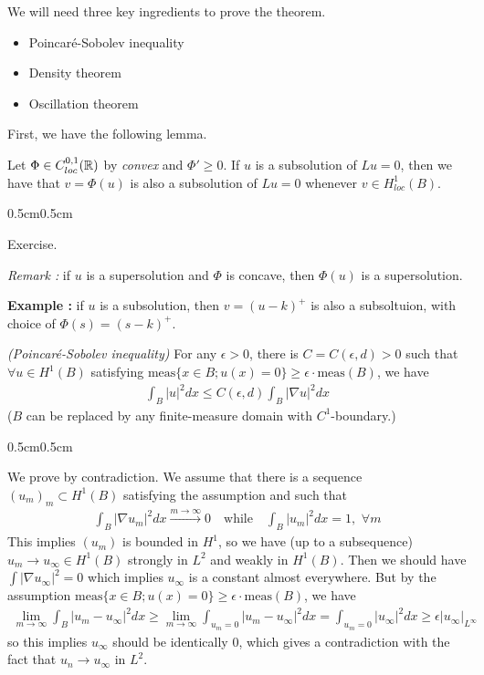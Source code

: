 \documentclass[12pt,a4paper]{article}
\newenvironment{proof}
{\begin{changemargin}{0.5cm}{0.5cm} 
	}%
	{\end{changemargin}
}
\newenvironment{p}
{\begin{proof} 
	}%
	{\end{proof}
}
\begin{document}
We will need three key ingredients to prove the theorem.
\begin{itemize}
\item Poincar\'{e}-Sobolev inequality
\item Density theorem
\item Oscillation theorem
\end{itemize}
\s

First, we have the following lemma.
\s

\lem Let $\Phi \in C^{0,1}_{loc}(\mathbb{R})$ by \emph{convex} and $\Phi' \geq 0$. If $u$ is a subsolution of $Lu =0$, then we have that $v= \Phi(u)$ is also a subsolution of $Lu =0$ whenever $v\in H_{loc}^1(B)$.
\begin{p}
\pf Exercise.
\end{p}
\s

\emph{Remark :} if $u$ is a supersolution and $\Phi$ is concave, then $\Phi(u)$ is a supersolution.
\s

\textbf{Example :} if $u$ is a subsolution, then $v = (u-k)^+$ is also a subsoltuion, with choice of $\Phi(s) = (s-k)^+$.
\s

\prop \emph{(Poincar\'e-Sobolev inequality)} For any $\epsilon >0$, there is $C = C(\epsilon, d)>0$ such that $\forall u\in H^1(B)$ satisfying $\text{meas}\{x\in B ; u(x) =0 \}\geq \epsilon \cdot \text{meas}(B)$, we have
\begin{align*}
\int_B |u|^2 dx \leq C(\epsilon, d) \int_B |\nabla u|^2 dx 
\end{align*}
($B$ can be replaced by any finite-measure domain with $C^{1}$-boundary.)
\begin{p}
\pf We prove by contradiction. We assume that there is a sequence $(u_m)_m \subset H^1(B)$ satisfying the assumption and such that
\begin{align*}
\int_B |\nabla u_m|^2 dx \xrightarrow{m\rightarrow \infty} 0 \quad \text{while} \quad \int_B |u_m|^2 dx = 1, \,\,\forall m
\end{align*} 
This implies $(u_m)$ is bounded in $H^1$, so we have (up to a subsequence) $u_m \rightarrow u_{\infty} \in H^1(B)$ strongly in $L^2$ and weakly in $H^1(B)$. Then we should have $\int |\nabla u_{\infty}|^2 =0$ which implies $u_{\infty}$ is a constant almost everywhere. But by the assumption $\text{meas}\{x\in B ; u(x) =0 \}\geq \epsilon \cdot \text{meas}(B)$, we have
\begin{align*}
\lim_{m\rightarrow \infty} \int_{B} |u_m - u_{\infty}|^2 dx \geq \lim_{m\rightarrow \infty} \int_{u_m =0} |u_m - u_{\infty}|^2 dx  = \int_{u_m =0} |u_{\infty}|^2 dx  \geq \epsilon |u_{\infty}|_{L^{\infty}}
\end{align*}
so this implies $u_{\infty}$ should be identically 0, which gives a contradiction with the fact that $u_n \rightarrow u_{\infty}$ in $L^2$.

\eop
\end{p}
\s
\end{document}
